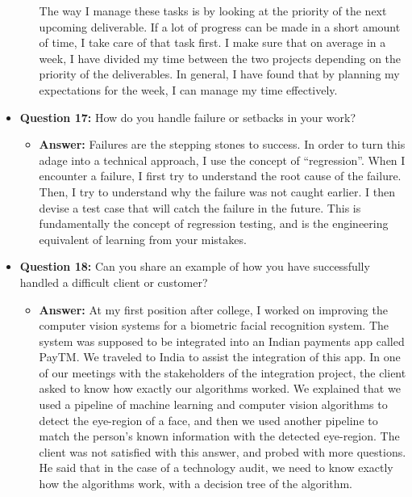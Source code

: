 \documentclass{article}
\begin{document}
\begin{itemize}
\begin{itemize}
        The way I manage these tasks is by looking at the priority of the next upcoming
        deliverable. If a lot of progress can be made in a short amount of time, I take
        care of that task first. I make sure that on average in a week, I have divided
        my time between the two projects depending on the priority of the deliverables.
        In general, I have found that by planning my expectations for the week, I can
        manage my time effectively.\\
    \end{itemize}
    
    \item \textbf{Question 17:} How do you handle failure or setbacks in your work?
    \begin{itemize}
        \item \textbf{Answer:} Failures are the stepping stones to success. In order
        to turn this adage into a technical approach, I use the concept of ``regression''.
        When I encounter a failure, I first try to understand the root cause of the failure.
        Then, I try to understand why the failure was not caught earlier. I then devise
        a test case that will catch the failure in the future. This is fundamentally
        the concept of regression testing, and is the engineering equivalent of
        learning from your mistakes.\\
    \end{itemize}
    
    \item \textbf{Question 18:} Can you share an example of how you have successfully handled a difficult client or customer?
    \begin{itemize}
        \item \textbf{Answer:} At my first position after college, I worked on improving the
        computer vision systems for a biometric facial recognition system. The system was supposed
        to be integrated into an Indian payments app called PayTM\@. We traveled to India to
        assist the integration of this app. In one of our meetings with the stakeholders of the
        integration project, the client asked to know how exactly our algorithms worked. We explained
        that we used a pipeline of machine learning and computer vision algorithms to detect
        the eye-region of a face, and then we used another pipeline to match the person's known
        information with the detected eye-region. The client was not satisfied with this answer,
        and probed with more questions. He said that in the case of a technology audit, we need
        to know exactly how the algorithms work, with a decision tree of the algorithm.\\


\end{itemize}
\end{itemize}
\end{document}
